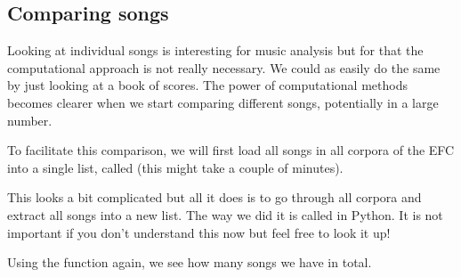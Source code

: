 \documentclass[letterpaper,10pt,english]{sphinxmanual}
\begin{document}
\subsection{Comparing songs}
\label{\detokenize{02_melody_I:Comparing-songs}}
Looking at individual songs is interesting for music analysis but for that the computational approach is not really necessary. We could as easily do the same by just looking at a book of scores. The power of computational methods becomes clearer when we start comparing different songs, potentially in a large number.

To facilitate this comparison, we will first load all songs in all corpora of the EFC into a single list, called  (this might take a couple of minutes).

{
\begin{sphinxVerbatim}[commandchars=\\\{\}]
\llap{\color{nbsphinxin}[36]:\,\hspace{\fboxrule}\hspace{\fboxsep}}  \PYG{p}{[}        \PYG{p}{[}\PYG{p}{]} \PYG{p}{]}
\end{sphinxVerbatim}
}

This looks a bit complicated but all it does is to go through all corpora and extract all songs into a new list. The way we did it is called  in Python. It is not important if you don’t understand this now but feel free to look it up!

Using the  function again, we see how many songs we have in total.

{
\begin{sphinxVerbatim}[commandchars=\\\{\}]
\llap{\color{nbsphinxin}[42]:\,\hspace{\fboxrule}\hspace{\fboxsep}}
\end{sphinxVerbatim}
}
\end{document}
